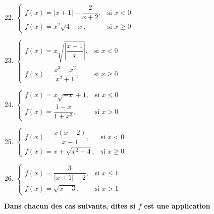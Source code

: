 \documentclass[12pt]{article}
\begin{document}
\begin{multicols}{3}
\columnbreak

\begin{enumerate}
    \setcounter{enumi}{21}
    \item $\left\{
        \begin{array}{ll}
            f(x) = |x + 1| - \dfrac{2}{x+2}, & \text{si } x < 0 \\
            f(x) = x^2 \sqrt{4 - x}, & \text{si } x \geq 0
        \end{array}
    \right.$
    
    \item $\left\{
        \begin{array}{ll}
            f(x) = x \sqrt{\left| \dfrac{x+1}{x} \right|}, & \text{si } x < 0 \\
            f(x) = \dfrac{x^3 - x^2}{x^2 + 1}, & \text{si } x \geq 0
        \end{array}
    \right.$
    
    \item $\left\{
        \begin{array}{ll}
            f(x) = x\sqrt{-x} + 1, & \text{si } x \leq 0 \\
            f(x) = \dfrac{1 - x}{1 + x^3}, & \text{si } x > 0
        \end{array}
    \right.$
    
    \item $\left\{
        \begin{array}{ll}
            f(x) = \dfrac{x(x-2)}{x-1}, & \text{si } x < 0 \\
            f(x) = x + \sqrt{x^2 - 4}, & \text{si } x \geq 0
        \end{array}
    \right.$
    
    \item $\left\{
        \begin{array}{ll}
            f(x) = \dfrac{3}{|x+1| - 2}, & \text{si } x \leq 1 \\
            f(x) = \sqrt{x - 3}, & \text{si } x > 1
        \end{array}
    \right.$
\end{enumerate}
\end{multicols}

 \quad \textbf{Dans chacun des cas suivants, dites si $f$ est une application}

\bigskip
\end{document}
